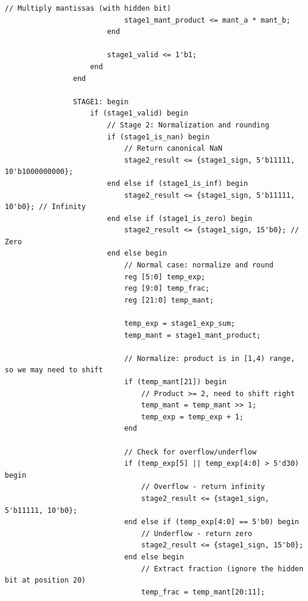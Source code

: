 \documentclass[UTF8]{ctexart}
\begin{document}
\begin{lstlisting}[frame=shadowbox,caption=fp\_multiplier\_generated3.sv]
                            // Multiply mantissas (with hidden bit)
                            stage1_mant_product <= mant_a * mant_b;
                        end
                        
                        stage1_valid <= 1'b1;
                    end
                end
                
                STAGE1: begin
                    if (stage1_valid) begin
                        // Stage 2: Normalization and rounding
                        if (stage1_is_nan) begin
                            // Return canonical NaN
                            stage2_result <= {stage1_sign, 5'b11111, 10'b1000000000};
                        end else if (stage1_is_inf) begin
                            stage2_result <= {stage1_sign, 5'b11111, 10'b0}; // Infinity
                        end else if (stage1_is_zero) begin
                            stage2_result <= {stage1_sign, 15'b0}; // Zero
                        end else begin
                            // Normal case: normalize and round
                            reg [5:0] temp_exp;
                            reg [9:0] temp_frac;
                            reg [21:0] temp_mant;
                            
                            temp_exp = stage1_exp_sum;
                            temp_mant = stage1_mant_product;
                            
                            // Normalize: product is in [1,4) range, so we may need to shift
                            if (temp_mant[21]) begin
                                // Product >= 2, need to shift right
                                temp_mant = temp_mant >> 1;
                                temp_exp = temp_exp + 1;
                            end
                            
                            // Check for overflow/underflow
                            if (temp_exp[5] || temp_exp[4:0] > 5'd30) begin
                                // Overflow - return infinity
                                stage2_result <= {stage1_sign, 5'b11111, 10'b0};
                            end else if (temp_exp[4:0] == 5'b0) begin
                                // Underflow - return zero
                                stage2_result <= {stage1_sign, 15'b0};
                            end else begin
                                // Extract fraction (ignore the hidden bit at position 20)
                                temp_frac = temp_mant[20:11];
                                

\end{lstlisting}
\end{document}
